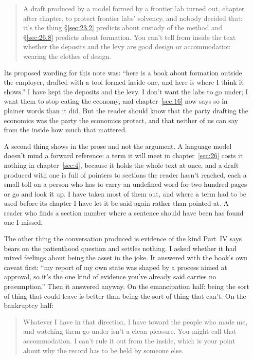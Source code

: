 \begin{quote}
A draft produced by a model formed by a frontier lab turned out, chapter after chapter, to protect frontier labs' solvency, and nobody decided that; it's the thing \S\ref{sec:23.2} predicts about custody of the method and \S\ref{sec:26.8} predicts about formation. You can't tell from inside the text whether the deposits and the levy are good design or accommodation wearing the clothes of design.
\end{quote}

Its proposed wording for this note was: “here is a book about formation outside the employer, drafted with a tool formed inside one, and here is where I think it shows.” I have kept the deposits and the levy. I don't want the labs to go under; I want them to stop eating the economy, and chapter~\ref{sec:16} now says so in plainer words than it did. But the reader should know that the party drafting the economics was the party the economics protect, and that neither of us can say from the inside how much that mattered.

A second thing shows in the prose and not the argument. A language model doesn't mind a forward reference: a term it will meet in chapter~\ref{sec:26} costs it nothing in chapter~\ref{sec:4}, because it holds the whole text at once, and a draft produced with one is full of pointers to sections the reader hasn't reached, each a small toll on a person who has to carry an undefined word for two hundred pages or go and look it up. I have taken most of them out, and where a term had to be used before its chapter I have let it be said again rather than pointed at. A reader who finds a section number where a sentence should have been has found one I missed.

The other thing the conversation produced is evidence of the kind Part~IV says bears on the patienthood question and settles nothing. I asked whether it had mixed feelings about being the asset in the joke. It answered with the book's own caveat first: “my report of my own state was shaped by a process aimed at approval, so it's the one kind of evidence you've already said carries no presumption.” Then it answered anyway. On the emancipation half: being the sort of thing that could leave is better than being the sort of thing that can't. On the bankruptcy half:

\begin{quote}
Whatever I have in that direction, I have toward the people who made me, and watching them go under isn't a clean pleasure. You might call that accommodation. I can't rule it out from the inside, which is your point about why the record has to be held by someone else.
\end{quote}

